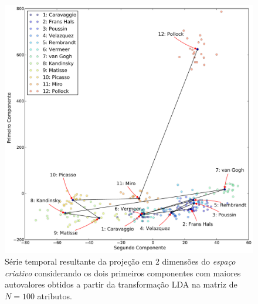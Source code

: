 \begin{figure}[h!]
\begin{center}
        \caption{Série temporal resultante da projeção em 2 dimensões do
        \textit{espaço criativo} considerando os dois primeiros componentes com
        maiores autovalores obtidos a partir da transformação LDA na matriz de
        $N = 100$ atributos.}
        \label{fig:caso3_g1}
        \includegraphics[width=\columnwidth]{figs/caso3_g1}
        \fonteminha
\end{center}
\end{figure}

